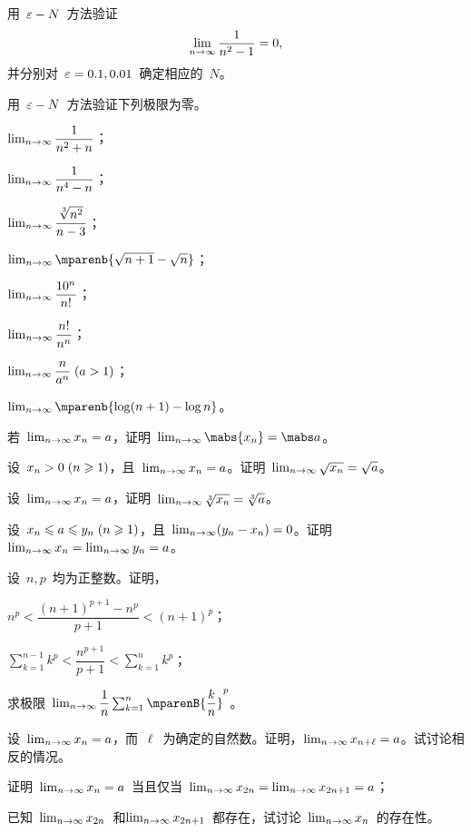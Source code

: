 \begin{exercise}
\item 用~$\varepsilon-N$~方法验证
\[
  \lim_{n\to\infty}\frac1{n^2-1}=0,
\]
并分别对~$\varepsilon=0.1,0.01$~确定相应的~$N$。
\item 用~$\varepsilon-N$~方法验证下列极限为零。
\begin{exlistcols}[3]
\item $\lim_{n\to\infty}\dfrac1{n^2+n}$；
\item $\lim_{n\to\infty}\dfrac1{n^4-n}$；
\item $\lim_{n\to\infty}\dfrac{\sqrt[3]{n^2}}{n-3}$；
\item $\lim_\ntoinf\mparenb{\sqrt{n+1}-\sqrt n}$；
\item $\lim_{n\to\infty}\dfrac{10^n}{n!}$；
\item $\lim_{n\to\infty}\dfrac{n!}{n^n}$；
\item $\lim_\ntoinf\dfrac n{a^n}\mcond{a>1}$；
\item $\lim_\ntoinf\mparenb{\ln(n+1)-\ln n}$。
\end{exlistcols}
\item 若~$\lim_{n\to\infty} x_n=a$，证明~$\lim_\ntoinf\mabs{x_n}=\mabs a$。
\item 设~$x_n>0\mcond{n\geq 1}$，且~$\lim_{n\to\infty} x_n=a$。证明~$\lim_{n\to\infty}\sqrt{x_n}=\sqrt a$。
\item 设~$\lim_{n\to\infty} x_n=a$，证明~$\lim_{n\to\infty}\sqrt[3]{x_n}=\sqrt[3]a$。
\item 设~$x_n\leq a\leq y_n\mcond{n\geq 1}$，且~$\lim_{n\to\infty}(y_n-x_n)=0$。证明~$\lim_{n\to\infty} x_n=\lim_{n\to\infty} y_n=a$。
\item 设~$n,p$~均为正整数。证明，
\begin{exlistcols}[2]
\item $n^p<\dfrac{(n+1)^{p+1}-n^p}{p+1}<(n+1)^p$；
\item $\sum_{k=1}^{n-1}k^p<\dfrac{n^{p+1}}{p+1}<\sum_{k=1}^nk^p$；
\item 求极限~$\lim_\ntoinf\dfrac1n\sum_{k=1}^n\mparenB{\dfrac kn}^p$。
\end{exlistcols}
\item 设~$\lim_{n\to\infty} x_n=a$，而~$\ell$~为确定的自然数。证明，$\lim_{n\to\infty} x_{n+\ell}=a$。试讨论相反的情况。
\item\begin{exlist}
  \item 证明~$\lim_{n\to\infty} x_n=a$~当且仅当~$\lim_{n\to\infty} x_{2n}=\lim_{n\to\infty} x_{2n+1}=a$；
  \item 已知~$\lim_{n\to\infty} x_{2n}$~和$\lim_{n\to\infty} x_{2n+1}$~都存在，试讨论~$\lim_{n\to\infty} x_n$~的存在性。

\end{exlist}
\end{exercise}
